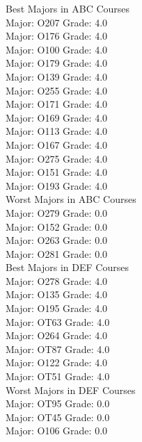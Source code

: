 
Best Majors in ABC Courses\\
Major: O207     Grade: 4.0\\
Major: O176     Grade: 4.0\\
Major: O100     Grade: 4.0\\
Major: O179     Grade: 4.0\\
Major: O139     Grade: 4.0\\
Major: O255     Grade: 4.0\\
Major: O171     Grade: 4.0\\
Major: O169     Grade: 4.0\\
Major: O113     Grade: 4.0\\
Major: O167     Grade: 4.0\\
Major: O275     Grade: 4.0\\
Major: O151     Grade: 4.0\\
Major: O193     Grade: 4.0\\

Worst Majors in ABC Courses\\
Major: O279     Grade: 0.0\\
Major: O152     Grade: 0.0\\
Major: O263     Grade: 0.0\\
Major: O281     Grade: 0.0\\

Best Majors in DEF Courses\\
Major: O278     Grade: 4.0\\
Major: O135     Grade: 4.0\\
Major: O195     Grade: 4.0\\
Major: OT63     Grade: 4.0\\
Major: O264     Grade: 4.0\\
Major: OT87     Grade: 4.0\\
Major: O122     Grade: 4.0\\
Major: OT51     Grade: 4.0\\

Worst Majors in DEF Courses\\
Major: OT95     Grade: 0.0\\
Major: OT45     Grade: 0.0\\
Major: O106     Grade: 0.0\\
